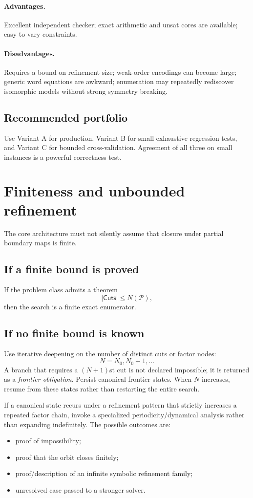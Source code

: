\documentclass[11pt]{article}
\newcommand{\Cuts}{\mathsf{Cuts}}
\begin{document}
\paragraph{Advantages.}
Excellent independent checker; exact arithmetic and unsat cores are available; easy to vary constraints.

\paragraph{Disadvantages.}
Requires a bound on refinement size; weak-order encodings can become large; generic word equations are awkward; enumeration may repeatedly rediscover isomorphic models without strong symmetry breaking.

\subsection{Recommended portfolio}

Use Variant A for production, Variant B for small exhaustive regression tests, and Variant C for bounded cross-validation.  Agreement of all three on small instances is a powerful correctness test.

\section{Finiteness and unbounded refinement}
\label{sec:finiteness}

The core architecture must not silently assume that closure under partial boundary maps is finite.

\subsection{If a finite bound is proved}
If the problem class admits a theorem
\[
  |\Cuts|\le N(\mathcal P),
\]
then the search is a finite exact enumerator.

\subsection{If no finite bound is known}
Use iterative deepening on the number of distinct cuts or factor nodes:
\[
  N=N_0,N_0+1,\ldots
\]
A branch that requires a $(N+1)$st cut is not declared impossible; it is returned as a \emph{frontier obligation}.  Persist canonical frontier states.  When $N$ increases, resume from these states rather than restarting the entire search.

If a canonical state recurs under a refinement pattern that strictly increases a repeated factor chain, invoke a specialized periodicity/dynamical analysis rather than expanding indefinitely.  The possible outcomes are:
\begin{itemize}
  \item proof of impossibility;
  \item proof that the orbit closes finitely;
  \item proof/description of an infinite symbolic refinement family;
  \item unresolved case passed to a stronger solver.
\end{itemize}
\end{document}
